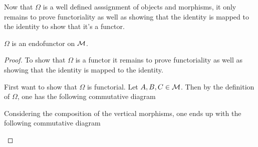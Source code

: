 Now that \( \Omega \) is a well defined asssignment of objects and morphisms, it only remains to prove functoriality as well as showing that the identity is mapped to the identity to show that it's a functor.

\begin{lemma}
    \label{lem:stmod_omega_endofunctor}
    \( \Omega \) is an endofunctor on \( {\mathcal{M}} \).
\end{lemma}
\begin{proof}
    To show that \( \Omega \) is a functor it remains to prove functoriality as well as showing that the identity is mapped to the identity.

    First want to show that \( \Omega \) is functorial. Let \( A, B, C \in {\mathcal{M}} \). Then by the definition of \( \Omega \), one has the following commutative diagram
    \begin{center}
    \end{center}

    Considering the composition of the vertical morphisms, one ends up with the following commutative diagram
    \begin{center}
\end{center}
\end{proof}
